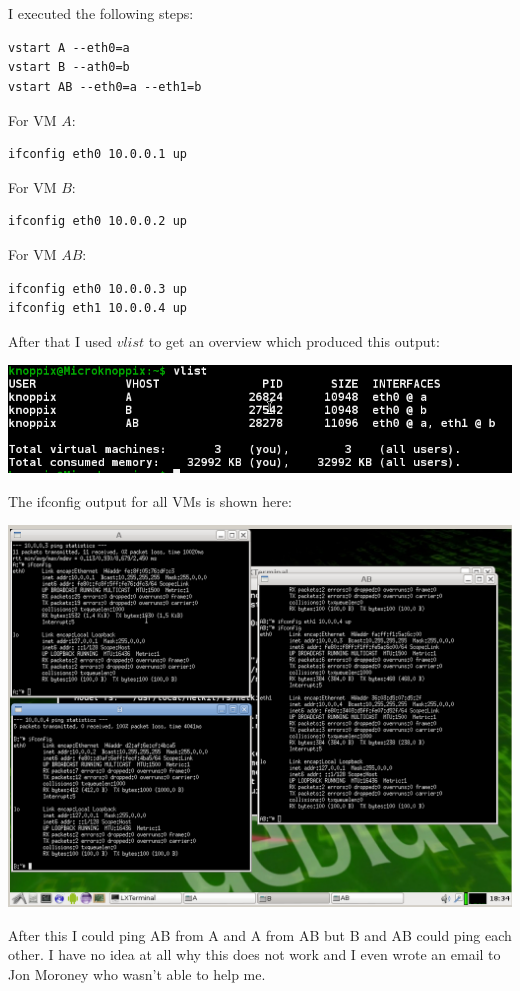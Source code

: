 \documentclass[12pt, a4paper]{article}
\begin{document}
\section{} %

\section{} %

I executed the following steps:

\begin{lstlisting}
vstart A --eth0=a
vstart B --ath0=b
vstart AB --eth0=a --eth1=b
\end{lstlisting}

For VM $A$:
\begin{lstlisting}
ifconfig eth0 10.0.0.1 up
\end{lstlisting}

For VM $B$:
\begin{lstlisting}
ifconfig eth0 10.0.0.2 up
\end{lstlisting}

For VM $AB$:
\begin{lstlisting}
ifconfig eth0 10.0.0.3 up
ifconfig eth1 10.0.0.4 up
\end{lstlisting}

After that I used $vlist$ to get an overview which produced this output:

\includegraphics[width=\linewidth]{screenshots/vlist}

The ifconfig output for all VMs is shown here:

\includegraphics[width=\linewidth]{screenshots/ifconfig}

After this I could ping AB from A and A from AB but B and AB could ping each other. I have no idea at all why this does not work and I even wrote an email to Jon Moroney who wasn't able to help me.
\end{document}
